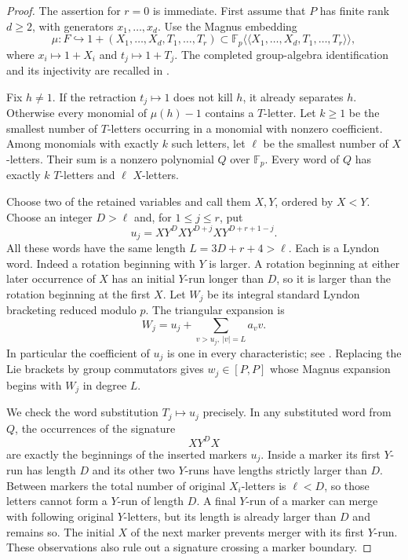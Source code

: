 \begin{proof}
The assertion for $r=0$ is immediate.  First assume that $P$ has
finite rank $d\geq2$, with generators $x_1,\ldots,x_d$.
Use the Magnus embedding
\[
 \mu:F\hookrightarrow
 1+(X_1,\ldots,X_d,T_1,\ldots,T_r)
 \subset\mathbb F_p\langle\!\langle X_1,\ldots,X_d,T_1,\ldots,T_r
                       \rangle\!\rangle,
\]
where $x_i\mapsto1+X_i$ and $t_j\mapsto1+T_j$.
The completed group-algebra identification and its injectivity
are recalled in \cite[\S3.1, equation~(3.3), p.~8]{MagnusKoszul}.

Fix $h\ne1$.  If the retraction $t_j\mapsto1$ does not kill $h$,
it already separates $h$.  Otherwise every monomial of
$\mu(h)-1$ contains a $T$-letter.  Let $k\geq1$ be the smallest
number of $T$-letters occurring in a monomial with nonzero
coefficient.  Among monomials with exactly $k$ such letters,
let $\ell$ be the smallest number of $X$-letters.
Their sum is a nonzero polynomial $Q$ over $\mathbb F_p$.
Every word of $Q$ has exactly $k$ $T$-letters and $\ell$
$X$-letters.

Choose two of the retained variables and call them $X,Y$,
ordered by $X<Y$.  Choose an integer $D>\ell$ and, for
$1\leq j\leq r$, put
\[
 u_j=X Y^D X Y^{D+j} X Y^{D+r+1-j}.
\]
All these words have the same length
$L=3D+r+4>\ell$.
Each is a Lyndon word.  Indeed a rotation beginning with $Y$
is larger.  A rotation beginning at either later occurrence
of $X$ has an initial $Y$-run longer than $D$, so it is larger
than the rotation beginning at the first $X$.
Let $W_j$ be its integral standard Lyndon bracketing reduced
modulo $p$.  The triangular expansion is
\[
 W_j=u_j+\sum_{v>u_j,\ |v|=L}a_vv.
\]
In particular the coefficient of $u_j$ is one in every
characteristic; see \cite[\S1, equation~(1.2)]{LalondeRam}.
Replacing the Lie brackets by group commutators gives
$w_j\in[P,P]$ whose Magnus expansion begins with $W_j$ in
degree $L$.

We check the word substitution $T_j\mapsto u_j$ precisely.
In any substituted word from $Q$, the occurrences of the
signature
\[
                             X Y^D X
\]
are exactly the beginnings of the inserted markers $u_j$.
Inside a marker its first $Y$-run has length $D$ and its
other two $Y$-runs have lengths strictly larger than $D$.
Between markers the total number of original $X_i$-letters
is $\ell<D$, so those letters cannot form a $Y$-run of
length $D$.  A final $Y$-run of a marker can merge with
following original $Y$-letters, but its length is already
larger than $D$ and remains so.  The initial $X$ of the
next marker prevents merger with its first $Y$-run.
These observations also rule out a signature crossing a
marker boundary.


\end{proof}
